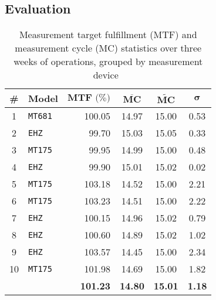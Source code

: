 \begin{appendices}
\FloatBarrier


\chapter{Evaluation}
\label{app:conclusion}

\begin{table}[hbt]
	\centering
  	\begin{tabularx}{\textwidth}{|c|X|r|c|c|c|}
		\hline
		\textbf{\#} & \textbf{Model} & $\textbf{MTF~(\%)}$ & ${\overline{\textbf{MC}}}$ & $\widetilde{\textbf{MC}}$ & $\boldsymbol{\sigma}$ \\
	    	\hline
	    1 	& \texttt{MT681} 	& 100.05 	& 14.97 & 15.00 & 0.53 \\ %
	    	\hline
	    	2 	& \texttt{EHZ}		& 99.70	 	& 15.03 & 15.05 & 0.33 \\ %
	    	\hline
	    	3 	& \texttt{MT175}	& 99.95 	& 14.99 & 15.00 & 0.48 \\ %
	    \hline
	    	4 	& \texttt{EHZ}		& 99.90 	& 15.01 & 15.02 & 0.02 \\ %
	    	\hline
	    5 	& \texttt{MT175}	& 103.18 	& 14.52 & 15.00 & 2.21 \\ %
	    	6 	& \texttt{MT175}	& 103.23 	& 14.51 & 15.00 & 2.22 \\ %
	    	\hline
	    7 	& \texttt{EHZ}		& 100.15 	& 14.96 & 15.02 & 0.79 \\ %
	    \hline
	    	8 	& \texttt{EHZ}		& 100.60 	& 14.89 & 15.02 & 1.02 \\ %
	    	\hline
	    9 	& \texttt{EHZ} 		& 103.57 	& 14.45 & 15.00 & 2.34 \\ %
	    	10 	& \texttt{MT175}	& 101.98 	& 14.69 & 15.00 & 1.82 \\ %
	    	\hline
	    	\hline
	    	& & \textbf{101.23} & \textbf{14.80} & \textbf{15.01} & \textbf{1.18}  \\
	    	\hline
	\end{tabularx}
  	\caption[Measurement statistics, grouped by measurement device]{Measurement target fulfillment ($\text{MTF}$) and measurement cycle ($\text{MC}$) statistics over three weeks of operations, grouped by measurement device~\footnotemark}
  	\label{tab:measurement-cycle-statistics}
\end{table}


\end{appendices}
